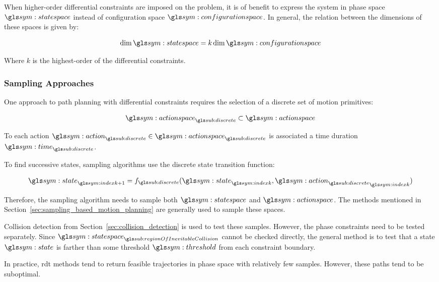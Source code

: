 			When higher-order differential constraints are imposed on the
			problem, it is of benefit to express the system in phase space
			$\phasespace$ instead of configuration space $\configurationspace$.
			In general, the relation between the dimensions of these spaces is
			given by:

			\begin{equation}
				\dim\phasespace = k\dim\configurationspace
			\end{equation}

			Where $k$ is the highest-order of the differential constraints.

		\subsubsection{Sampling Approaches}%
		\label{sec:sampling_approaches}

			One approach to path planning with differential constraints requires
			the selection of a discrete set of motion primitives:

			\begin{equation}
				\actionspace_{\discrete} \subset \actionspace
			\end{equation}

			To each action $\action_{\discrete} \in \actionspace_{\discrete}$ is
			associated a time duration $\timesym_{\discrete}$.

			To find successive states, sampling algorithms use the discrete
			state transition function:

			\begin{equation}
				\state_{\indexk + 1} = f_{\discrete}(\state_{\indexk},
					{\action_{\discrete}}_{\indexk})
			\end{equation}

			Therefore, the sampling algorithm needs to sample both $\phasespace$
			and $\actionspace$. The methods mentioned in
			Section~\ref{sec:sampling_based_motion_planning} are generally used
			to sample these spaces.

			Collision detection from Section~\ref{sec:collision_detection} is
			used to test these samples. However, the phase constraints need to
			be tested separately. Since
			$\phasespace_{\regionOfInevitableCollision}$ cannot be checked
			directly, the general method is to test that a state $\state$ is
			farther than some threshold $\threshold$ from each constraint
			boundary.

			In practice, \gls{rdt} methods tend to return feasible trajectories
			in phase space with relatively few samples. However, these paths
			tend to be suboptimal.



